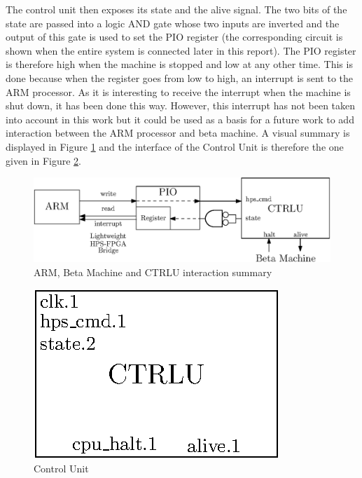 The control unit then exposes its state and the alive signal. The two bits of the state are passed 
into a logic AND gate whose two inputs are inverted and the output of this gate is used to set the 
PIO register (the corresponding circuit is shown when the entire system is connected later in this 
report). The PIO register is  therefore high when the machine is stopped and low at any other time. 
This is done because when the register goes from low to high, an interrupt is sent to the ARM 
processor. As it is interesting to receive the interrupt when the machine is shut down, it has been 
done this way. However, this interrupt has not been taken into account in this work but it could be 
used as a basis for a future work to add interaction between the ARM processor and beta machine. 
A visual summary is displayed in Figure \ref{fig:ctrlu/summary} and the interface of the Control 
Unit is therefore the one given in Figure \ref{fig:ctrlu}.

\begin{figure}[ht!]
    \center
    \includegraphics[scale=0.8]{"Chapter5-MAU_CTRLU/res/ctrlu_summary"}
    \caption{ARM, Beta Machine and CTRLU interaction summary}
    \label{fig:ctrlu/summary}
\end{figure}

\begin{figure}[ht!]
    \center
    \includegraphics[scale=0.8]{"Chapter5-MAU_CTRLU/res/ctrlu"}
    \caption{Control Unit}
    \label{fig:ctrlu}
\end{figure}
